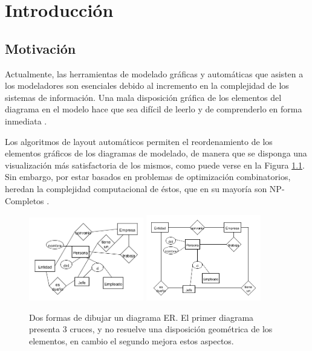 \chapter{Introducci\'on}\label{cap1}

\section{Motivaci\'on}
Actualmente, las herramientas de  modelado gráficas  y automáticas que asisten a los  modeladores son esenciales  debido al incremento  en la complejidad de los sistemas de información. Una mala disposición gráfica de los elementos del  diagrama en el modelo hace que sea difícil de leerlo y de comprenderlo en forma inmediata \cite{Sto14,Sto11,Huang07,ware02}.
	
	Los algoritmos de layout automáticos permiten el reordenamiento de los  elementos gráficos de los diagramas de modelado, de manera que se disponga una visualización más satisfactoria de los mismos, como puede verse en la Figura \ref{fig:ejemplo_crossnum}.
	Sin embargo, por estar basados en problemas de optimización combinatorios, heredan la  complejidad computacional de éstos,  que en su mayoría  son  NP-Completos \cite{Papadimitriou1976, Garey:1974}. 
	
	\begin{figure}[h]
		\centering
		\includegraphics[width=5cm]{imagenes/ejemplo_malo.png}
		\hspace{1.5cm}
		\includegraphics[width=5cm]{imagenes/ejemplo_bueno.png}
		\caption{Dos formas de dibujar un diagrama ER. El primer diagrama presenta 3 cruces, y no resuelve una disposición geométrica de los elementos, en cambio el segundo mejora estos aspectos.}
		\label{fig:ejemplo_crossnum}
	\end{figure}
	
